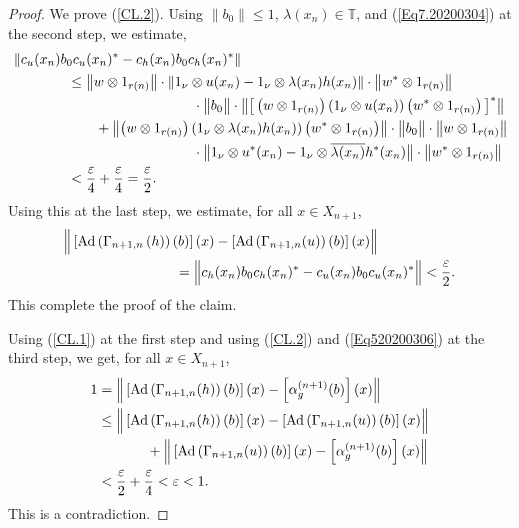 \documentclass[10pt]{amsart}
\numberwithin{equation}{section}
\theoremstyle{definition}
\newcommand{\ep}{\varepsilon}
\newcommand{\Ad}{{\operatorname{Ad}}}
\begin{document}
\begin{proof}
We prove (\ref{CL.2}).
Using $\| b_0 \|\leq 1$, $\lambda(x_n)\in \mathbb{T}$, and (\ref{Eq7.20200304}) at the second step,
we estimate,
\begin{align*}
&\left\|
c_{u} (x_n) b_0 c_{u} (x_n)^* - c_{h} (x_n) b_0 c_{h} (x_n)^*
\right\|
\\
&\hspace*{4em} {\mbox{}}
\leq
\left\| w \otimes 1_{r(n)}\right\| 
\cdot
\left\|1_{\nu} \otimes u(x_n) - 1_{\nu} \otimes \lambda(x_n) h(x_n) \right\|
\cdot
\left\|w^* \otimes 1_{r(n)} \right\|
\\\notag 
&\hspace*{13em} {\mbox{}} \cdot
\big\|
b_0
\big\|
\cdot
\big\|
\big[
\left(w \otimes 1_{r(n)}\right) \left(1_{\nu} \otimes u(x_n)\right)  \left(w^* \otimes 1_{r(n)}\right)
\big]^* 
\big\|
\\\notag
& \hspace*{6em} {\mbox{}}+
\left\|
\left(w \otimes 1_{r(n)}\right) \left(1_{\nu} \otimes \lambda(x_n) h(x_n)\right) \left(w^* \otimes 1_{r(n)}\right)
\right\|
\cdot
\big\|
b_0
\big\|
\cdot
\left\|w \otimes 1_{r(n)} \right\|
\\\notag 
&\hspace*{13em} {\mbox{}} \cdot
\big\|1_{\nu} \otimes u^*(x_n) - 1_{\nu} \otimes \overline{\lambda(x_n)} h^*(x_n) \big\|
\cdot
\big\|w^* \otimes 1_{r(n)} \big\|
\\\notag
&\hspace*{4em} {\mbox{}}<
\frac{\ep}{4} + \frac{\ep}{4}=\frac{\ep}{2}.
\end{align*}
Using this at the last step, we estimate, for all $x \in X_{n+1}$,
\begin{align*}
&\Big\| 
\left[\Ad \left(\Gamma_{n+1, n} \left(h\right)\right) (b)\right](x)
 - 
 \left[\Ad \left(\Gamma_{n+1, n}(u)\right) (b)\right] (x)
\Big\|
\\
&\hspace*{8em} {\mbox{}} =
\Big\|
c_{h} (x_n) b_0 c_{h} (x_n)^*
 -
c_{u} (x_n) b_0 c_{u} (x_n)^*
\Big\|
< 
\frac{\ep}{2}.
\end{align*}
This complete the proof of the claim.

Using (\ref{CL.1}) at the first step and using (\ref{CL.2}) and (\ref{Eq520200306}) at the third step,
 we get, for all $x \in X_{n+1}$,
\begin{align*}
&
1= 
\Big\|
\left[\Ad \left(\Gamma_{n+1, n}(h)\right)(b)\right](x)
- 
\left[\alpha^{(n+1)}_{g} (b)\right](x) 
\Big\|
\\
&\hspace*{.5em} {\mbox{}} \leq 
\Big\| 
\left[\Ad \left(\Gamma_{n+1, n} (h)\right) (b)\right](x)
 - 
 \left[\Ad \left(\Gamma_{n+1, n}(u)\right) (b)\right] (x)
  \Big\|
 \\&\hspace*{4em} {\mbox{}}+
\Big\|
\left[\Ad \left(\Gamma_{n+1, n}(u)\right) (b)\right] (x) 
- 
\left[\alpha^{(n+1)}_{g} (b)\right](x) 
\Big\|
\\\notag
&\hspace*{.5em} {\mbox{}}<
\frac{\ep}{2}+ \frac{\ep}{4} < \ep <1.
\end{align*}
This is a  contradiction.




\end{proof}
\end{document}

